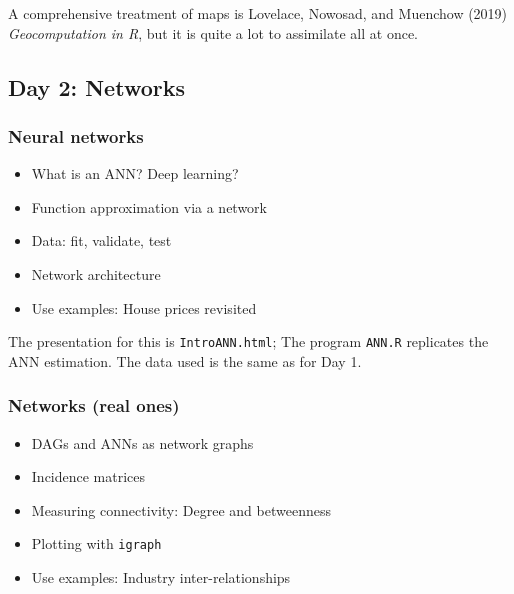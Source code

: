 \documentclass[
  letterpaper,
]{book}
\providecommand{\tightlist}{%
  \setlength{\itemsep}{0pt}\setlength{\parskip}{0pt}}\usepackage{longtable,booktabs,array}
\begin{document}
A comprehensive treatment of maps is Lovelace, Nowosad, and Muenchow
(2019) \emph{Geocomputation in R}, but it is quite a lot to assimilate
all at once.

\hypertarget{day-2-networks}{%
\subsection{Day 2: Networks}\label{day-2-networks}}

\hypertarget{neural-networks}{%
\subsubsection{Neural networks}\label{neural-networks}}

\begin{itemize}
\tightlist
\item
  What is an ANN? Deep learning?
\item
  Function approximation via a network
\item
  Data: fit, validate, test
\item
  Network architecture
\item
  Use examples: House prices revisited
\end{itemize}

The presentation for this is \texttt{IntroANN.html}; The program
\texttt{ANN.R} replicates the ANN estimation. The data used is the same
as for Day 1.

\hypertarget{networks-real-ones}{%
\subsubsection{Networks (real ones)}\label{networks-real-ones}}

\begin{itemize}
\tightlist
\item
  DAGs and ANNs as network graphs
\item
  Incidence matrices
\item
  Measuring connectivity: Degree and betweenness
\item
  Plotting with \texttt{igraph}
\item
  Use examples: Industry inter-relationships
\end{itemize}
\end{document}
